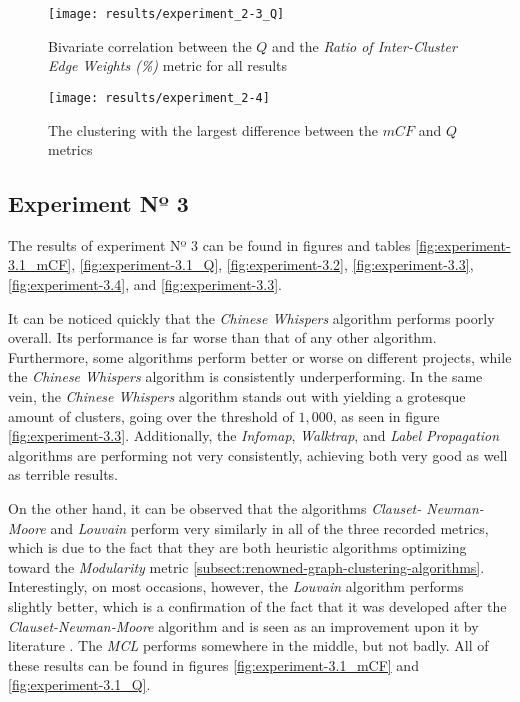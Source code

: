 \documentclass[12pt,a4paper]{report}
\begin{document}
\begin{figure}[htbp]
\centering
\texttt{[image: results/experiment\_2-3\_Q]}
\caption{Bivariate correlation between the $Q$ and the \textit{Ratio of Inter-Cluster Edge Weights (\%)} metric for all results}
\label{fig:experiment-2.3_Q}
\end{figure}

\begin{figure}[htbp]
\centering
\texttt{[image: results/experiment\_2-4]}
\caption{The clustering with the largest difference between the $mCF$ and $Q$ metrics}
\label{fig:experiment-2.4}
\end{figure}


\subsection{Experiment Nº 3}

The results of experiment Nº 3 can be found in figures and tables
\ref{fig:experiment-3.1_mCF}, \ref{fig:experiment-3.1_Q}, \ref{fig:experiment-3.2},
\ref{fig:experiment-3.3}, \ref{fig:experiment-3.4}, and \ref{fig:experiment-3.3}.

It can be noticed quickly that the \textit{Chinese Whispers} algorithm performs
poorly overall. Its performance is far worse than that of any other algorithm.
Furthermore, some algorithms perform better or worse on different projects,
while the \textit{Chinese Whispers} algorithm is consistently underperforming.
In the same vein, the \textit{Chinese Whispers} algorithm stands out with
yielding a grotesque amount of clusters, going over the threshold of $1,000$,
as seen in figure \ref{fig:experiment-3.3}. Additionally, the \textit{Infomap},
\textit{Walktrap}, and \textit{Label Propagation} algorithms are performing not
very consistently, achieving both very good as well as terrible results.

On the other hand, it can be observed that the algorithms \textit{Clauset-
Newman-Moore} and \textit{Louvain} perform very similarly in all of the three
recorded metrics, which is due to the fact that they are both heuristic
algorithms optimizing toward the \textit{Modularity} metric
\ref{subsect:renowned-graph-clustering-algorithms}. Interestingly, on most occasions,
however, the \textit{Louvain} algorithm performs slightly better, which is a
confirmation of the fact that it was developed after the \textit{Clauset-Newman-Moore}
algorithm and is seen as an improvement upon it by literature
\cite{lancichinetti2009community}. The \textit{MCL} performs somewhere in the middle,
but not badly. All of these results can be found in figures
\ref{fig:experiment-3.1_mCF} and \ref{fig:experiment-3.1_Q}.
\end{document}
